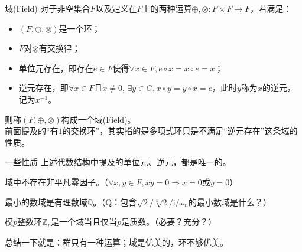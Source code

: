 \documentclass{beamer}
\begin{document}
\begin{frame}{域(Field)}
	对于非空集合$F$以及定义在$F$上的两种运算$\oplus, \otimes: F \times F \to F$，若满足：
	\begin{itemize}
		\item $(F, \oplus, \otimes)$是一个环；
		\item $F$对$\otimes$有交换律；
		\item 单位元存在，即存在$e \in F$使得$\forall x \in F, e \circ x = x \circ e = x$；
		\item 逆元存在，即$\forall x \in F$且$x \neq 0$, $\exists y \in G, x \circ y = y \circ x = e$，此时$y$称为$x$的逆元，记为$x^{-1}$。
	\end{itemize}

	则称$(F, \oplus, \otimes)$构成一个域(Field)。\\
	
	前面提及的“有$1$的交换环”，其实指的是多项式环只是不满足“逆元存在”这条域的性质。
\end{frame}
\begin{frame}{一些性质}
	上述代数结构中提及的单位元、逆元，都是唯一的。\\\pause
	
	域中不存在非平凡零因子。（$\forall x, y \in F, xy = 0 \Rightarrow x = 0 $或$ y = 0$）\\\pause
	
	最小的数域是有理数域$\mathbb Q$。（Q：包含$\sqrt 2 / \sqrt[n]{2} / \mathrm i / \omega_n$的最小数域是什么？）\\\pause
	
	模$p$整数环$\mathbb Z_p$是一个域当且仅当$p$是质数。（必要？充分？）\\
	\pause
	
	总结一下就是：群只有一种运算；域是优美的，环不够优美。
	
\end{frame}
\end{document}
